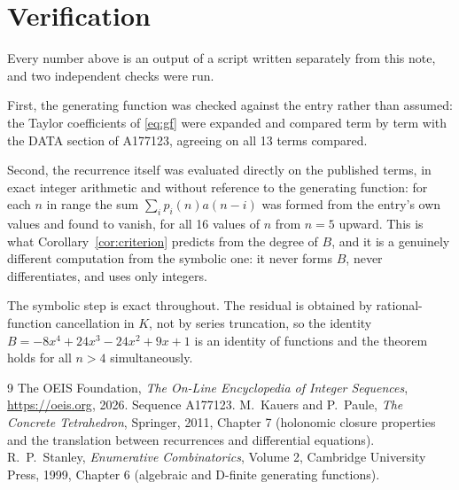 \documentclass[11pt,a4paper]{article}
\theoremstyle{plain}
\theoremstyle{definition}
\begin{document}
\section{Verification}

Every number above is an output of a script written separately from this note, and two
independent checks were run.

First, the generating function was checked against the entry rather than assumed: the
Taylor coefficients of \eqref{eq:gf} were expanded and compared term by term with the DATA
section of A177123, agreeing on all 13 terms compared.

Second, the recurrence itself was evaluated directly on the published terms, in exact
integer arithmetic and without reference to the generating function: for each $n$ in range
the sum $\sum_{i}p_{i}(n)a(n-i)$ was formed from the entry's own values and found to
vanish, for all 16 values of $n$ from $n=5$ upward. This is what
Corollary~\ref{cor:criterion} predicts from the degree of $B$, and it is a genuinely
different computation from the symbolic one: it never forms $B$, never differentiates, and
uses only integers.

The symbolic step is exact throughout. The residual is obtained by rational-function
cancellation in $K$, not by series truncation, so the identity $B=- 8 x^{4} + 24 x^{3} - 24 x^{2} + 9 x + 1$ is an
identity of functions and the theorem holds for all $n>4$ simultaneously.

\begin{thebibliography}{9}
 The OEIS Foundation, \emph{The On-Line Encyclopedia of Integer Sequences},
\url{https://oeis.org}, 2026. Sequence A177123.
 M.~Kauers and P.~Paule, \emph{The Concrete Tetrahedron}, Springer, 2011,
Chapter 7 (holonomic closure properties and the translation between recurrences and
differential equations).
 R.~P.~Stanley, \emph{Enumerative Combinatorics}, Volume 2, Cambridge
University Press, 1999, Chapter 6 (algebraic and D-finite generating functions).
\end{thebibliography}
\end{document}
